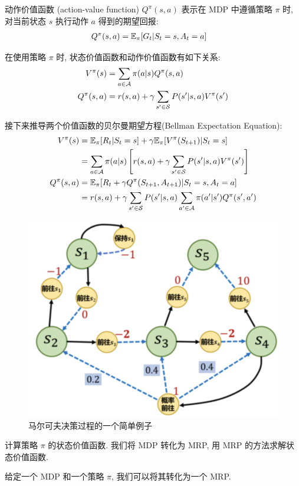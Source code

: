 \begin{definition}[动作价值函数]
    动作价值函数 (action-value function) $Q^\pi(s,a)$ 表示在 MDP 中遵循策略 $\pi$ 时, 对当前状态 $s$ 执行动作 $a$ 得到的期望回报:
    \begin{align*}
        Q^\pi(s,a)&=\mathbb{E}_\pi [G_t | S_t =s, A_t = a]
    \end{align*}
\end{definition}

在使用策略 $\pi$ 时, 状态价值函数和动作价值函数有如下关系:
\begin{align*}
    V^\pi(s) &= \sum_{a\in\mathcal{A}} \pi(a|s) Q^\pi(s,a)\\
    Q^\pi(s,a) &= r(s,a) + \gamma \sum_{s'\in\mathcal{S}}P(s'|s,a)V^\pi(s')
\end{align*}

接下来推导两个价值函数的贝尔曼期望方程(Bellman Expectation Equation):
\begin{align*}
    V^\pi(s) &= \mathbb{E}_\pi [R_t | S_t = s]  + \gamma \mathbb{E}_\pi [ V^\pi(S_{t+1}) | S_t = s]\\ 
    &= \sum_{a\in\mathcal{A}}\pi(a|s) \left[ r(s,a) + \gamma \sum_{s'\in\mathcal{S}} P(s'|s, a)V^\pi(s') \right]\\
    Q^\pi(s,a) &= \mathbb{E}_\pi [R_t +\gamma Q^\pi(S_{t+1}, A_{t+1}) | S_t = s, A_t=a]\\ 
    &=r(s,a) + \gamma \sum_{s'\in\mathcal{S}} P(s'|s,a)\sum_{a'\in\mathcal{A}}\pi(a'|s')Q^\pi(s', a')
\end{align*}

\begin{figure}[!htb]
    \centering
    \includegraphics[width=0.618\linewidth]{pic/RL3/马尔可夫决策过程的一个简单例子.png}
    \caption{马尔可夫决策过程的一个简单例子}
\end{figure}


计算策略 $\pi$ 的状态价值函数. 我们将 MDP 转化为 MRP, 用 MRP 的方法求解状态价值函数. 
\begin{theorem}
    给定一个 MDP 和一个策略 $\pi$, 我们可以将其转化为一个 MRP.
\end{theorem}

